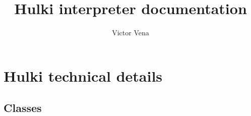 \documentclass{article}
\title{Hulki interpreter documentation}
\author{Victor Vena}
\begin{document}
\maketitle

\section{Hulki technical details}
    \subsection{Classes}
        
\end{document}
